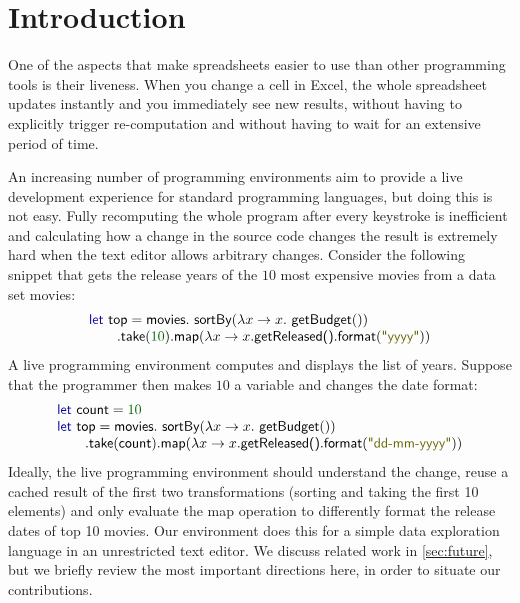 \documentclass[english,crc,references=cleveref]{programming}
\theoremstyle{plain}
\theoremstyle{definition}
\newcommand{\Num}[1]{\num[color=numclr]{#1}}
\newcommand{\str}[1]{\textnormal{\textcolor{strclr}{\sffamily "#1"}}}
\newcommand{\ident}[1]{\textnormal{\textcolor{idclr}{\sffamily #1}}}
\newcommand{\kvd}[1]{\textnormal{\textcolor{kvdclr}{\sffamily #1}}}
\begin{document}
\section{Introduction}
\label{sec:intro}
One of the aspects that make spreadsheets easier to use than other programming tools is their
liveness. When you change a cell in Excel, the whole spreadsheet updates instantly
and you immediately see new results, without having to explicitly trigger re-computation
and without having to wait for an extensive period of time.

An increasing number of programming environments aim to provide a live development experience
for standard programming languages, but doing this is not easy. Fully recomputing the whole program
after every keystroke is inefficient and calculating how a change in the source code changes the
result is extremely hard when the text editor allows arbitrary changes.
Consider the following snippet that gets the release years of the $10$ most expensive movies from a
data set \ident{movies}:
%
\begin{equation*}
\begin{array}{l}
\kvd{let}~\ident{top} =\ident{movies}.\ident{sortBy}(\lambda x \rightarrow x.\ident{getBudget}())\\
\qquad .\ident{take}(\Num{10}).\ident{map}(\lambda x \rightarrow x.\ident{getReleased()}.\ident{format}(\str{yyyy}))\\
\end{array}
\end{equation*}
%
A live programming environment computes and displays the list of years. Suppose that the programmer then
makes $\Num{10}$ a variable and changes the date format:
%
\begin{equation*}
\begin{array}{l}
\kvd{let}~\ident{count} = \Num{10}\\
\kvd{let}~\ident{top} = \ident{movies}.\ident{sortBy}(\lambda x \rightarrow x.\ident{getBudget}())\\
\qquad .\ident{take}(\ident{count}).\ident{map}(\lambda x \rightarrow x.\ident{getReleased()}.\ident{format}(\str{dd-mm-yyyy}))\\
\end{array}
\end{equation*}
%
Ideally, the live programming environment should understand the change, reuse a cached result of the
first two transformations (sorting and taking the first 10 elements) and only evaluate the
\ident{map} operation to differently format the release dates of top 10 movies. Our environment
does this for a simple data exploration language in an unrestricted text editor. We discuss related
work in \cref{sec:future}, but we briefly review the most important directions here, in
order to situate our contributions.
\end{document}
